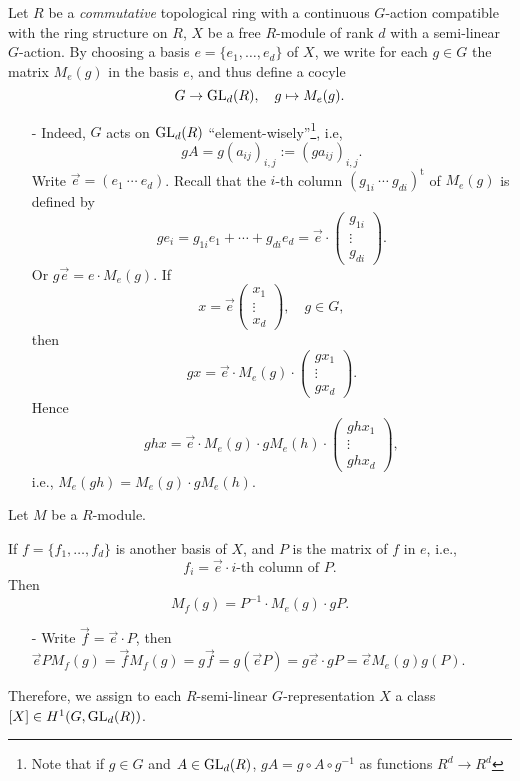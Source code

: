 \begin{example}
    Let $R$ be a \textit{commutative} topological ring with a continuous $G$-action compatible with the ring structure on $R$,
    $X$ be a free $R$-module of rank $d$ with a semi-linear $G$-action.
By choosing a basis $e = \{e_1, \dots, e_d\}$ of $X$,
we write for each $g\in G$ the matrix $M_e(g)$ in the basis $e$, and thus define a cocyle \[G\to\operatorname{GL}_d(R),\quad g\mapsto M_e(g).\]
\begin{itemize}
\item[-]Indeed, $G$ acts on $\operatorname{GL}_d(R)$ ``element-wisely''\footnote{
    Note that if $g\in G$ and $A\in\operatorname{GL}_d(R)$, $gA = g\circ A\circ g^{-1}$ as functions $R^d\to R^d$
}, i.e, \[gA = g (a_{ij})_{i, j} := (ga_{ij})_{i, j}.\]
Write \(\vec{e} = (e_1\ \cdots\ e_d) \).
Recall that the $i$-th column $(g_{1i}\ \cdots\ g_{di})^{\mathrm t}$ of $M_e(g)$ is defined by
\[ge_i = g_{1i}e_1 + \cdots + g_{di}e_d = \vec e
\cdot \begin{pmatrix}
    g_{1i}\\ \vdots \\ g_{di}
\end{pmatrix}.\]
Or $g\vec{e} = e\cdot M_e(g)$.
If \[x = \vec{e}\begin{pmatrix}
    x_1\\ \vdots\\ x_d
\end{pmatrix},\quad g\in G,\]
then \[gx =\vec{e} \cdot M_e(g)\cdot \begin{pmatrix}
    gx_1\\ \vdots \\ gx_d
\end{pmatrix}.\]
Hence \[ghx = \vec{e}\cdot M_e(g)\cdot gM_e(h)\cdot\begin{pmatrix}
    ghx_1\\ \vdots\\ ghx_d
\end{pmatrix},\]
i.e., $M_e(gh) = M_e(g)\cdot gM_e(h)$.

\end{itemize}
Let $M$ be a $R$-module.


If $f = \{f_1, \dots, f_d\}$ is another basis of $X$,
and $P$ is the matrix of $f$ in $e$, i.e., \[f_i = \vec{e}\cdot i\text{-th column of }P.
\]
Then \[M_f(g) = P^{-1}\cdot M_e(g)\cdot gP.\]
\begin{itemize}
\item[-]
Write $\vec{f} = \vec{e}\cdot P$,
then $\vec{e}PM_f(g) =\vec{f}M_f(g) = g\vec{f} = g(\vec{e}P) = g\vec{e}\cdot gP = \vec{e}M_e(g)g(P).$
\end{itemize}
Therefore, we assign to each $R$-semi-linear $G$-representation $X$ a class $[X]\in H^1(G, \operatorname{GL}_d(R))$.
\end{example}

